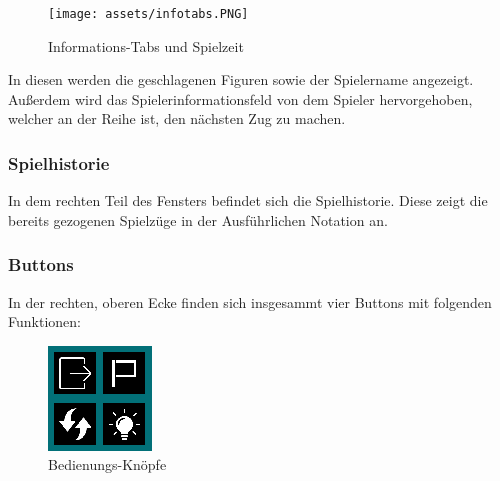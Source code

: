 \documentclass[a4paper, 10pt]{scrartcl}
\begin{document}
\begin{figure}[h]
        \centering
        \texttt{[image: assets/infotabs.PNG]}
        \caption{Informations-Tabs und Spielzeit}
\end{figure}
In diesen werden die geschlagenen Figuren sowie der Spielername angezeigt. Außerdem wird das Spielerinformationsfeld von dem Spieler hervorgehoben, welcher an der Reihe ist, den
nächsten Zug zu machen.

\subsubsection*{Spielhistorie}

In dem rechten Teil des Fensters befindet sich die Spielhistorie.
Diese zeigt die bereits gezogenen Spielzüge in der \glqq Ausführlichen Notation\grqq{} an. 

\subsubsection*{Buttons}
In der rechten, oberen Ecke finden sich insgesammt vier Buttons mit folgenden Funktionen:
\begin{figure}
        \centering
        \vspace{48mm}
        \includegraphics{assets/Buttons.PNG}
        \caption{Bedienungs-Knöpfe}
\end{figure}
\end{document}

